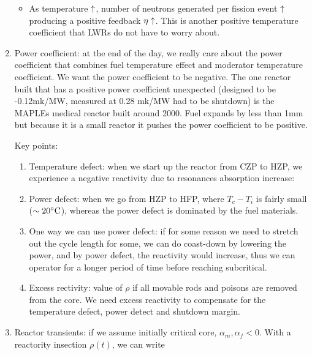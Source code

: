 \documentclass{school-22.211-notes}
\begin{document}
\begin{enumerate}
\begin{itemize}
\item As temperature $\uparrow$, number of neutrons generated per fission event $\uparrow$ producing a positive feedback $\eta \uparrow$. This is another positive temperature coefficient that LWRs do not have to worry about. 
\end{itemize}


\item Power coefficient: at the end of the day, we really care about the power coefficient that combines fuel temperature effect and moderator temperature coefficient. We want the power coefficient to be negative. 
The one reactor built that has a positive power coefficient unexpected (designed to be -0.12mk/MW, measured at 0.28 mk/MW had to be shutdown) is the MAPLEs medical reactor built around 2000. 
Fuel expands by less than 1mm but because it is a small reactor it pushes the power coefficient to be positive. 

Key points:
\begin{enumerate}
\item Temperature defect: when we start up the reactor from CZP to HZP, we experience a negative reactivity due to resonances absorption increase: 

\item Power defect: when we go from HZP to HFP, 
  where $T_c - T_i$ is fairly small ($\sim 20^\circ\mathrm{C}$), whereas the power defect is dominated by the fuel materials. 

\item One way we can use power defect: if for some reason we need to stretch out the cycle length for some, we can do coast-down by lowering the power, and by power defect, the reactivity would increase, thus we can operator for a longer period of time before reaching subcritical. 

\item Excess rectivity: value of $\rho$ if all movable rods and poisons are removed from the core. We need excess reactivity to compensate for the temperature defect, power detect and shutdown margin. 
\end{enumerate}

\item Reactor transients: if we assume initially critical core, $\alpha_m, \alpha_f < 0$. With a reactority insection $\rho(t)$, we can write 



\end{enumerate}
\end{document}
